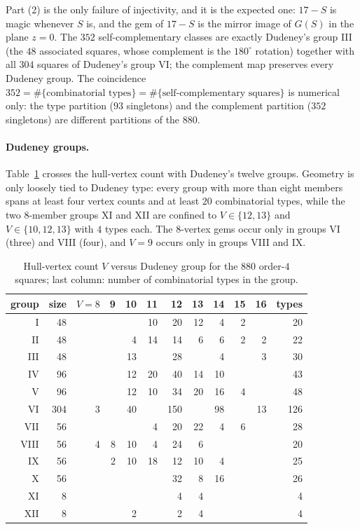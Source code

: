 Part (2) is the only failure of injectivity, and it is the expected one:
$17-S$ is magic whenever $S$ is, and the gem of $17-S$ is the mirror image of
$G(S)$ in the plane $z=0$.  The $352$ self-complementary classes are exactly
Dudeney's group III (the $48$ associated squares, whose complement is the
$180^\circ$ rotation) together with all $304$ squares of Dudeney's
group VI; the complement map preserves every Dudeney group.  The coincidence
$352 = \#\{\text{combinatorial types}\} = \#\{\text{self-complementary
squares}\}$ is numerical only: the type partition ($93$ singletons) and the
complement partition ($352$ singletons) are different partitions of the $880$.

\paragraph{Dudeney groups.}
Table~\ref{tab:dudeney-gems} crosses the hull-vertex count with Dudeney's
twelve groups.  Geometry is only loosely tied to Dudeney type: every group
with more than eight members spans at least four vertex counts and at least
$20$ combinatorial types, while the two $8$-member groups XI and XII are
confined to $V\in\{12,13\}$ and $V\in\{10,12,13\}$ with $4$ types each.  The
$8$-vertex gems occur only in groups VI (three) and VIII (four), and
$V=9$ occurs only in groups VIII and IX.

\begin{table}[htbp]
\centering
\caption{Hull-vertex count $V$ versus Dudeney group for the $880$ order-$4$
squares; last column: number of combinatorial types in the group.}
\label{tab:dudeney-gems}
\small
\begin{tabular}{rr|rrrrrrrrr|r}
\toprule
group & size & $V{=}8$ & 9 & 10 & 11 & 12 & 13 & 14 & 15 & 16 & types \\
\midrule
I & 48 &  &  &  & 10 & 20 & 12 & 4 & 2 &  & 20 \\
II & 48 &  &  & 4 & 14 & 14 & 6 & 6 & 2 & 2 & 22 \\
III & 48 &  &  & 13 &  & 28 &  & 4 &  & 3 & 30 \\
IV & 96 &  &  & 12 & 20 & 40 & 14 & 10 &  &  & 43 \\
V & 96 &  &  & 12 & 10 & 34 & 20 & 16 & 4 &  & 48 \\
VI & 304 & 3 &  & 40 &  & 150 &  & 98 &  & 13 & 126 \\
VII & 56 &  &  &  & 4 & 20 & 22 & 4 & 6 &  & 28 \\
VIII & 56 & 4 & 8 & 10 & 4 & 24 & 6 &  &  &  & 20 \\
IX & 56 &  & 2 & 10 & 18 & 12 & 10 & 4 &  &  & 25 \\
X & 56 &  &  &  &  & 32 & 8 & 16 &  &  & 26 \\
XI & 8 &  &  &  &  & 4 & 4 &  &  &  & 4 \\
XII & 8 &  &  & 2 &  & 2 & 4 &  &  &  & 4 \\
\bottomrule
\end{tabular}
\end{table}

